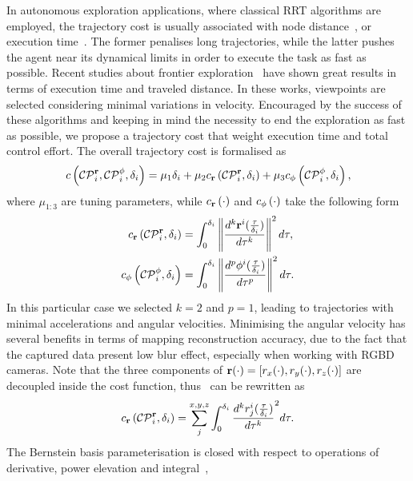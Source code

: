 In autonomous exploration applications, where classical RRT algorithms are employed, the trajectory cost is usually associated with node
distance~\cite{selin2019efficient, bircher2016receding}, or execution time~\cite{schmid2020efficient}. The former penalises long trajectories,
while the latter pushes the agent near its dynamical limits in order to execute the task as fast as possible. Recent studies about frontier
exploration~\cite{cieslewski2017rapid} have shown great results in terms of execution time and traveled distance. In these works, viewpoints
are selected considering minimal variations in velocity. Encouraged by the success of these algorithms and keeping in mind the necessity
to end the exploration as fast as possible, we propose a trajectory cost that weight execution time and total control effort.
The overall trajectory cost is formalised as
\begin{equation*}
	c \left( \mathcal{CP}^{\mathbf{r}}_{i}, \mathcal{CP}^{\phi}_{i}, \delta_{i} \right) =
		\mu_1 \delta_i + \mu_2 c_{\mathbf{r}} \left( \mathcal{CP}^{\mathbf{r}}_{i}, \delta_{i} \right) + \mu_3 c_{\phi} \left( \mathcal{CP}^{\phi}_{i}, \delta_i \right),
\end{equation*}
where $\mu_{1:3}$ are tuning parameters, while $c_{\mathbf{r}} \left( \cdot \right)$ and $c_{\phi} \left( \cdot \right)$ take the following form
\begin{align}
	\label{EQ:EXPLORATION-TRAJ-COST-RR}
	c_{\mathbf{r}} \left( \mathcal{CP}^{\mathbf{r}}_i, \delta_i \right) & = \int_0^{\delta_i}  \left \lVert {\frac{d^k \mathbf{r}^i(\frac{\tau}{\delta_i})}{d\tau^k}} \right \rVert^2 d\tau, \\
	\label{EQ:EXPLORATION-TRAJ-COST-YAW}
	c_{\phi} \left( \mathcal{CP}^{\phi}_i, \delta_i \right) & = \int_0^{\delta_i}  \left \lVert {\frac{d^p \phi^i(\frac{\tau}{\delta_i})}{d\tau^p}} \right \rVert^2 d\tau.
\end{align}
In this particular case we selected $k = 2$ and $p = 1$, leading to trajectories with minimal accelerations and angular velocities.
Minimising the angular velocity has several benefits in terms of mapping reconstruction accuracy, due to the fact that
the captured data present low blur effect, especially when working with RGBD cameras. Note that the three components of
$\mathbf{r}(\cdot) = [r_x(\cdot), r_y(\cdot), r_z(\cdot)]$ are decoupled inside the cost function, thus~
can be rewritten as
\begin{equation}%
	\label{EQ:EXPLORATION-COST-RR-DECOUPLED}
	c_{\rr} \lp \CP^{\rr}_i, \delta_i \rp = \sum_{j}^{x,y,z} \int_0^{\delta_i} \frac{d^k \ri^i_{j}(\frac{\tau}{\delta_i})}{d\tau^k}^2 d\tau.
\end{equation}
The Bernstein basis parameterisation is closed with respect to operations of derivative, power elevation and integral~\cite{farouki2012bernstein},

